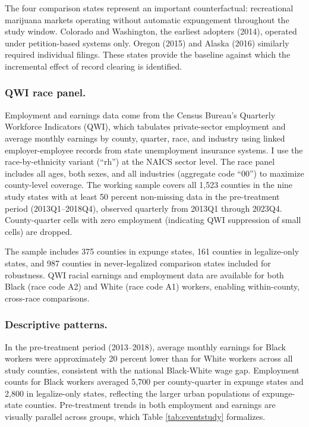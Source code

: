 \documentclass[12pt]{article}
\begin{document}
The four comparison states represent an important counterfactual: recreational marijuana markets operating without automatic expungement throughout the study window. Colorado and Washington, the earliest adopters (2014), operated under petition-based systems only. Oregon (2015) and Alaska (2016) similarly required individual filings. These states provide the baseline against which the incremental effect of record clearing is identified.



\subsubsection*{QWI race panel.} Employment and earnings data come from the Census Bureau's Quarterly Workforce Indicators (QWI), which tabulates private-sector employment and average monthly earnings by county, quarter, race, and industry using linked employer-employee records from state unemployment insurance systems. I use the race-by-ethnicity variant (``rh'') at the NAICS sector level. The race panel includes all ages, both sexes, and all industries (aggregate code ``00'') to maximize county-level coverage. The working sample covers all 1,523 counties in the nine study states with at least 50 percent non-missing data in the pre-treatment period (2013Q1--2018Q4), observed quarterly from 2013Q1 through 2023Q4. County-quarter cells with zero employment (indicating QWI suppression of small cells) are dropped.

The sample includes 375 counties in expunge states, 161 counties in legalize-only states, and 987 counties in never-legalized comparison states included for robustness. QWI racial earnings and employment data are available for both Black (race code A2) and White (race code A1) workers, enabling within-county, cross-race comparisons.

\subsubsection*{Descriptive patterns.} In the pre-treatment period (2013--2018), average monthly earnings for Black workers were approximately 20 percent lower than for White workers across all study counties, consistent with the national Black-White wage gap. Employment counts for Black workers averaged 5,700 per county-quarter in expunge states and 2,800 in legalize-only states, reflecting the larger urban populations of expunge-state counties. Pre-treatment trends in both employment and earnings are visually parallel across groups, which Table \ref{tab:eventstudy} formalizes.
\end{document}
